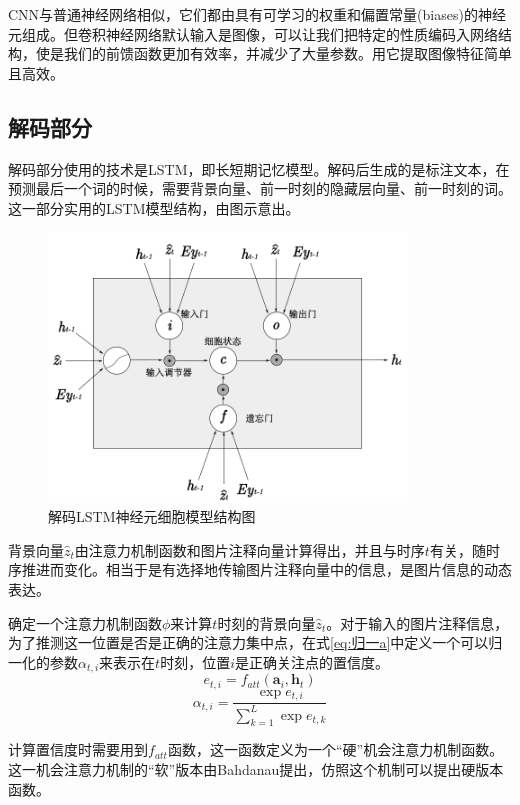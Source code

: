 CNN与普通神经网络相似，它们都由具有可学习的权重和偏置常量(biases)的神经元组成。但卷积神经网络默认输入是图像，可以让我们把特定的性质编码入网络结构，使是我们的前馈函数更加有效率，并减少了大量参数。用它提取图像特征简单且高效。

\subsection{解码部分}
解码部分使用的技术是LSTM，即长短期记忆模型。解码后生成的是标注文本，在预测最后一个词的时候，需要背景向量、前一时刻的隐藏层向量、前一时刻的词。这一部分实用的LSTM模型结构，由图示意出。
\begin{figure}[!htbp]
    \centering
    \includegraphics[width=0.85\textwidth]{figures/lstm_token.png}
    \caption{解码LSTM神经元细胞模型结构图}
    \label{fig:lstm_tokenize}
\end{figure}

背景向量$\hat{z}_t$由注意力机制函数和图片注释向量计算得出，并且与时序$t$有关，随时序推进而变化。相当于是有选择地传输图片注释向量中的信息，是图片信息的动态表达。

确定一个注意力机制函数$\phi$来计算$t$时刻的背景向量$\hat{z}_t$。对于输入的图片注释信息，为了推测这一位置是否是正确的注意力集中点，在式\eqref{eq:归一a}中定义一个可以归一化的参数$\alpha_{t,i}$来表示在$t$时刻，位置$i$是正确关注点的置信度。
\begin{equation}
    e_{t,i}=f_{att}(\textbf{a}_i,\textbf{h}_t)
\end{equation}
\begin{equation}
    \label{eq:归一a}
    \alpha_{t,i}=\frac{\exp e_{t,i}}{\sum_{k=1}^{L}\exp e_{t,k}}
\end{equation}

计算置信度时需要用到$f_{att}$函数，这一函数定义为一个“硬”机会注意力机制函数。
这一机会注意力机制的“软”版本由Bahdanau提出，仿照这个机制可以提出硬版本函数。


